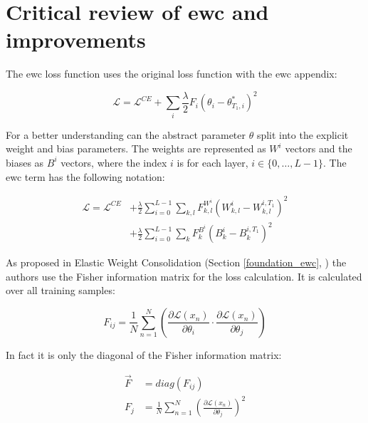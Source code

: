 \section{Critical review of \acrshort{ewc} and improvements}
\label{project_review_improvements}

The \acrshort{ewc} loss function uses the original loss function with the \acrshort{ewc} appendix:

\begin{equation}
    \mathcal{L} = 
    \mathcal{L}^{CE} 
    + \sum_{i} 
        \frac{\lambda}{2} 
        F_{i} 
        (\theta_{i} - \theta_{T_1,i}^{*})^2
\end{equation}

For a better understanding can the abstract parameter $\theta$ split into the explicit weight and bias parameters.
The weights are represented as $W^i$ vectors and the biases as $B^i$ vectors, where the index $i$ is for each layer, $i \in \{ 0, \dots, L-1 \}$.
The \acrshort{ewc} term has the following notation:

\begin{equation}
    \begin{split}
        \mathcal{L} = \mathcal{L}^{CE}
        & + \frac{\lambda}{2} \sum_{i=0}^{L-1} \sum_{k, l} F_{k, l}^{W^i}\left(W^i_{k, l}-W^{i,{T_1}}_{k, l} \right)^2
        \\
        & +  \frac{\lambda}{2}\sum_{i=0}^{L-1} \sum_{k}F^{B^i}_k\left(B^i_{k}-B^{i,{T_1}}_{k} \right)^2
    \end{split}
\end{equation}

As proposed in Elastic Weight Consolidation (Section \ref{foundation_ewc}, \cite{elastic-weight-consolidation}) the authors use the Fisher information matrix for the loss calculation. It is calculated over all training samples:

\begin{equation}
    F_{ij} = 
    \frac{1}{N} 
    \sum_{n=1}^{N} 
    \left(
        \frac{\partial \mathcal{L} \left( x_n \right) }{\partial \theta_{i}} 
        \cdot 
        \frac{\partial \mathcal{L} \left( x_n \right) }{\partial \theta_{j}}
    \right)
\end{equation}

In fact it is only the diagonal of the Fisher information matrix:

\begin{equation}
    \begin{split}
        \vec{F} & = diag \left( F_{ij} \right)
        \\
        F_{j} & = 
        \frac{1}{N} 
        \sum_{n=1}^{N} 
        \left(
            \frac{\partial \mathcal{L} \left( x_n \right) }{\partial \theta_{j}}
        \right)^2
    \end{split}
\end{equation}

